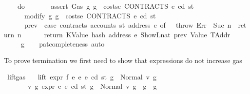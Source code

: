 \begin{isabellebody}
\ \ \ \ {\isacharparenleft}{\kern0pt}do\ {\isacharbraceleft}{\kern0pt}\isanewline
\ \ \ \ \ \ assert\ Gas\ {\isacharparenleft}{\kern0pt}{\isasymlambda}g{\isachardot}{\kern0pt}\ g\ {\isachargreater}{\kern0pt}\ costs\isactrlsub e\ CONTRACTS\ e\ cd\ st{\isacharparenright}{\kern0pt}{\isacharsemicolon}{\kern0pt}\isanewline
\ \ \ \ \ \ modify\ {\isacharparenleft}{\kern0pt}{\isasymlambda}g{\isachardot}{\kern0pt}\ g\ {\isacharminus}{\kern0pt}\ costs\isactrlsub e\ CONTRACTS\ e\ cd\ st{\isacharparenright}{\kern0pt}{\isacharsemicolon}{\kern0pt}\isanewline
\ \ \ \ \ \ prev\ {\isasymleftarrow}\ case\ contracts\ {\isacharparenleft}{\kern0pt}accounts\ st\ {\isacharparenleft}{\kern0pt}address\ e{\isacharparenright}{\kern0pt}{\isacharparenright}{\kern0pt}\ of\ {}\ {\isasymRightarrow}\ throw\ Err\ {\isacharbar}{\kern0pt}\ Suc\ n\ {\isasymRightarrow}\ return\ n{\isacharsemicolon}{\kern0pt}\isanewline
\ \ \ \ \ \ return\ {\isacharparenleft}{\kern0pt}KValue\ {\isacharparenleft}{\kern0pt}hash\ {\isacharparenleft}{\kern0pt}address\ e{\isacharparenright}{\kern0pt}\ {\isacharparenleft}{\kern0pt}ShowL\isactrlsub n\isactrlsub a\isactrlsub t\ prev{\isacharparenright}{\kern0pt}{\isacharparenright}{\kern0pt}{\isacharcomma}{\kern0pt}\ Value\ TAddr{\isacharparenright}{\kern0pt}\isanewline
\ \ \ \ {\isacharbraceright}{\kern0pt}{\isacharparenright}{\kern0pt}\ g{\isachardoublequoteclose}\isanewline
%
\isadelimproof
\ \ %
\endisadelimproof
%
\isatagproof
{}\isamarkupfalse%
\ pat{\isacharunderscore}{\kern0pt}completeness\ auto%
\endisatagproof
{\isafoldproof}%
%
\isadelimproof
%
\endisadelimproof
%
\isadelimdocument
%
\endisadelimdocument
%
\isatagdocument
%
\isamarkuptrue%
%
\endisatagdocument
{\isafolddocument}%
%
\isadelimdocument
%
\endisadelimdocument
%
\begin{isamarkuptext}%
To prove termination we first need to show that expressions do not increase gas%
\end{isamarkuptext}\isamarkuptrue%
\isamarkupfalse%
\ lift{\isacharunderscore}{\kern0pt}gas{\isacharcolon}{\kern0pt}\isanewline
\ \ \ {\isachardoublequoteopen}lift\ expr\ f\ e{}\ e{}\ e\ cd\ st\ g\ {\isacharequal}{\kern0pt}\ Normal\ {\isacharparenleft}{\kern0pt}v{\isacharcomma}{\kern0pt}\ g{\isacharprime}{\kern0pt}{\isacharparenright}{\kern0pt}{\isachardoublequoteclose}\isanewline
\ \ \ \ \ \ \ {\isachardoublequoteopen}{\isasymAnd}v\ g{\isacharprime}{\kern0pt}{\isachardot}{\kern0pt}\ expr\ e{}\ e\ cd\ st\ g\ {\isacharequal}{\kern0pt}\ Normal\ {\isacharparenleft}{\kern0pt}v{\isacharcomma}{\kern0pt}\ g{\isacharprime}{\kern0pt}{\isacharparenright}{\kern0pt}\ {\isasymLongrightarrow}\ g{\isacharprime}{\kern0pt}\ {\isasymle}\ g{\isachardoublequoteclose}\isanewline

\end{isabellebody}
